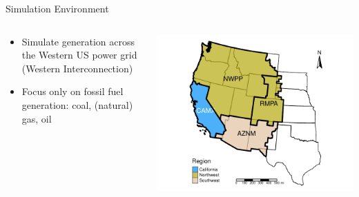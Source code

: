 \documentclass[11pt, aspectratio = 169]{beamer}
\newcommand{\1}{\mathds{1}}
\begin{document}
\begin{frame}{Simulation Environment}
    
\begin{columns}
    \begin{column}{0.5\textwidth}
    
    \begin{itemize}
        \item Simulate generation across the Western US power grid (Western Interconnection)
        \vspace*{1em}
        \item Focus only on fossil fuel generation: coal, (natural) gas, oil
    \end{itemize}    

    \end{column}
    \begin{column}{0.5\textwidth}
        \includegraphics[width = \textwidth]{figures/chapter3_figures/WECC_map.pdf}
    \end{column}
\end{columns}

\end{frame}
\end{document}
